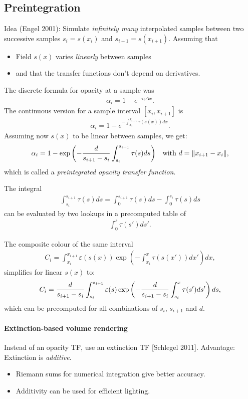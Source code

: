 \subsection{Preintegration}
Idea (Engel 2001): Simulate \emph{infinitely many} interpolated samples between two successive samples $s_i= s(x_i)$ and $s_{i+1} = s(x_{i+1})$. Assuming that 
\begin{itemize}
    \item Field $s(x)$ varies \emph{linearly} between samples
    \item and that the transfer functions don't depend on derivatives.
\end{itemize}

The discrete formula for opacity at a sample was
\begin{align*}
    \alpha_i = 1-e^{-\tau_i \Delta x}.
\end{align*}
The continuous version for a sample interval $[x_i, x_{i+1}]$ is 
\begin{align*}
    \alpha_i = 1-e^{-\int_{x_i}^{x_{i+1}} \tau(s(x)) dx}.
\end{align*}
Assuming now $s(x)$ to be linear between samples, we get:
\begin{align*}
    \alpha_i &= 1-\exp\left( {-{d\over s_{i+1}-s_i} \int_{s_i}^{s_{i+1}}\tau(s) ds}\right) &\text{with } d= \norm{x_{i+1}-x_i}, 
\end{align*}
which is called a \emph{preintegrated opacity transfer function}.


The integral
\begin{align*}
\int_{s_i}^{s_{i+1}} \tau(s) ds = \int_0^{s_{i+1}} \tau(s) ds - \int_0^{s_i} \tau(s)ds
\end{align*}
can be evaluated by two lookups in a precomputed table of 
\begin{align*}
\int_0^{s} \tau(s')ds'.
\end{align*}

The composite colour of the same interval
\begin{align*}
  C_i = \int_{x_i}^{x_{i+1}} \varepsilon (s(x))\exp\left(-\int_{x_i}^x \tau(s(x'))dx'\right) dx,
\end{align*}
simplifies for linear $s(x)$ to:
\begin{align*}
  C_i = {d\over {s_{i+1}-s_i}} \int_{s_i}^{s_{i+1}} \varepsilon (s)\exp\left(-{d\over {s_{i+1}-s_i}} \int_{s_i}^x \tau(s')ds'\right) ds,
\end{align*}
which can be precomputed for all combinations of $s_i$, $s_{i+1}$ and $d$.

\paragraph{Extinction-based volume rendering}
Instead of an opacity TF, use an extinction TF [Schlegel 2011]. Advantage: Extinction is \emph{additive}.
\begin{itemize}
    \item Riemann sums for numerical integration give better accuracy.
    \item Additivity can be used for efficient lighting.
\end{itemize}




